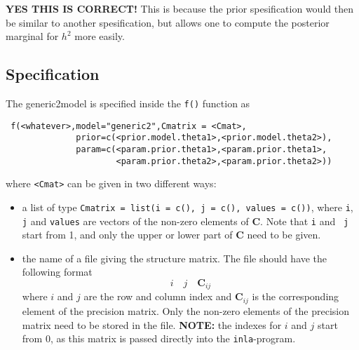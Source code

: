 \documentclass[a4paper,11pt]{article}
\begin{document}
\textbf{YES THIS IS CORRECT!} This is because the prior spesification
would then be similar to another spesification, but allows one to
compute the posterior marginal for $h^{2}$ more easily.

\subsection*{Specification}

The generic2model is specified inside the {\tt f()} function as
\begin{verbatim}
 f(<whatever>,model="generic2",Cmatrix = <Cmat>,
              prior=c(<prior.model.theta1>,<prior.model.theta2>),
              param=c(<param.prior.theta1>,<param.prior.theta1>,
                      <param.prior.theta2>,<param.prior.theta2>))
\end{verbatim}
where {\tt <Cmat>} can be given in two different ways:
\begin{itemize}
\item a list of type {\tt Cmatrix = list(i = c(), j = c(), values =
        c())}, where {\tt i}, {\tt j} and {\tt values} are vectors of
    the non-zero elements of $\mathbf{C}$. Note that {\tt i} and {\tt
        j} start from 1, and only the upper or lower part of
    $\mathbf{C}$ need to be given.
\item the name of a file giving the structure matrix. The file should
    have the following format
    \[
    i\quad j\quad \mathbf{C}_{ij}
    \]
    where $i$ and $j$ are the row and column index and
    $\mathbf{C}_{ij}$ is the corresponding element of the precision
    matrix. Only the non-zero elements of the precision matrix need to
    be stored in the file. {\bf NOTE:} the indexes for $i$ and $j$
    start from 0, as this matrix is passed directly into the
    \texttt{inla}-program.
\end{itemize}
\end{document}
